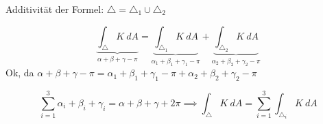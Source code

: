 \documentclass[../main.tex]{subfiles}
\begin{document}
\begin{preparation}
Additivität der Formel:
$\triangle = \triangle _1 \cup \triangle _2$

\begin{minipage}{8em}
\end{minipage}
\begin{minipage}{32em}
    $$\underbrace{\int_{\triangle} K \ dA}_{\alpha + \beta + \gamma - \pi } = \underbrace{\int_{\triangle_1}K \ dA }_{\alpha_1 + \beta_1 + \gamma_1 - \pi}+ \underbrace{\int_{\triangle_2}K \ dA}_{\alpha_2 + \beta_2 + \gamma_2 - \pi}$$
    Ok, da $\alpha + \beta + \gamma - \pi = \alpha_1 + \beta_1 + \gamma_1 - \pi + \alpha_2 + \beta_2 + \gamma_2 - \pi$
\end{minipage}
\begin{minipage}{8em}
\end{minipage}
\begin{minipage}{32em}
    $$\sum_{i=1}^{3} \alpha_i + \beta_i + \gamma_i = \alpha + \beta + \gamma + 2\pi \implies \int_{\triangle}K \ dA = \sum_{i=1}^{3}\int_{\triangle_i}K \ dA$$
\end{minipage}
\end{preparation}
\end{document}
